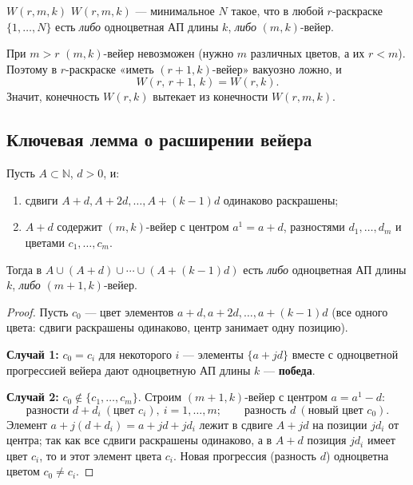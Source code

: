 \begin{Definition}{$W(r,m,k)$}{}
	$W(r,m,k)$ — минимальное $N$ такое, что в любой $r$-раскраске $\{1,\ldots,N\}$ есть \emph{либо} одноцветная АП длины $k$, \emph{либо} $(m,k)$-вейер.
\end{Definition}

\begin{Remark}{}{}
	При $m>r$ $(m,k)$-вейер невозможен (нужно $m$ различных цветов, а их $r<m$). Поэтому в $r$-раскраске «иметь $(r{+}1,k)$-вейер» вакуозно ложно, и
	\[
	W(r,\,r+1,\,k)=W(r,k).
	\]
	Значит, конечность $W(r,k)$ вытекает из конечности $W(r,m,k)$.
\end{Remark}

\subsection{Ключевая лемма о расширении вейера}

\begin{Lemma}{}{}
	Пусть $A\subset\mathbb N$, $d>0$, и:
	\begin{enumerate}
		\item сдвиги $A+d,A+2d,\ldots,A+(k-1)d$ одинаково раскрашены;
		\item $A+d$ содержит $(m,k)$-вейер с центром $a^1=a+d$, разностями $d_1,\ldots,d_m$ и цветами $c_1,\ldots,c_m$.
	\end{enumerate}
	Тогда в $A\cup(A+d)\cup\cdots\cup(A+(k-1)d)$ есть \emph{либо} одноцветная АП длины $k$, \emph{либо} $(m+1,k)$-вейер.
\end{Lemma}

\begin{proof}
	Пусть $c_0$ — цвет элементов $a+d,a+2d,\ldots,a+(k-1)d$ (все одного цвета: сдвиги раскрашены одинаково, центр занимает одну позицию).

	\textbf{Случай 1:} $c_0=c_i$ для некоторого $i$ — элементы $\{a+jd\}$ вместе с одноцветной прогрессией вейера дают одноцветную АП длины $k$ — \textbf{победа}.

	\textbf{Случай 2:} $c_0\notin\{c_1,\ldots,c_m\}$. Строим $(m+1,k)$-вейер с центром $a=a^1-d$:
	\[
	\text{разности } d+d_i\ (\text{цвет }c_i),\ i=1,\ldots,m;\qquad \text{разность } d\ (\text{новый цвет }c_0).
	\]
	Элемент $a+j(d+d_i)=a+jd+jd_i$ лежит в сдвиге $A+jd$ на позиции $jd_i$ от центра; так как все сдвиги раскрашены одинаково, а в $A+d$ позиция $jd_i$ имеет цвет $c_i$, то и этот элемент цвета $c_i$. Новая прогрессия (разность $d$) одноцветна цветом $c_0\neq c_i$.
\end{proof}

